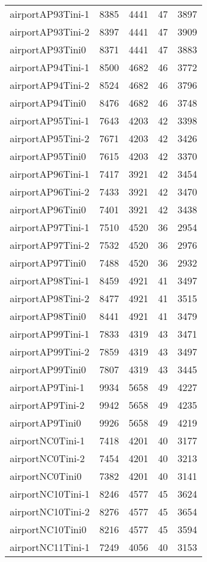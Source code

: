 \begin{longtable}{lrrrr}
airportAP93Tini-1 & 8385 & 4441 & 47 & 3897 \\
airportAP93Tini-2 & 8397 & 4441 & 47 & 3909 \\
airportAP93Tini0 & 8371 & 4441 & 47 & 3883 \\
airportAP94Tini-1 & 8500 & 4682 & 46 & 3772 \\
airportAP94Tini-2 & 8524 & 4682 & 46 & 3796 \\
airportAP94Tini0 & 8476 & 4682 & 46 & 3748 \\
airportAP95Tini-1 & 7643 & 4203 & 42 & 3398 \\
airportAP95Tini-2 & 7671 & 4203 & 42 & 3426 \\
airportAP95Tini0 & 7615 & 4203 & 42 & 3370 \\
airportAP96Tini-1 & 7417 & 3921 & 42 & 3454 \\
airportAP96Tini-2 & 7433 & 3921 & 42 & 3470 \\
airportAP96Tini0 & 7401 & 3921 & 42 & 3438 \\
airportAP97Tini-1 & 7510 & 4520 & 36 & 2954 \\
airportAP97Tini-2 & 7532 & 4520 & 36 & 2976 \\
airportAP97Tini0 & 7488 & 4520 & 36 & 2932 \\
airportAP98Tini-1 & 8459 & 4921 & 41 & 3497 \\
airportAP98Tini-2 & 8477 & 4921 & 41 & 3515 \\
airportAP98Tini0 & 8441 & 4921 & 41 & 3479 \\
airportAP99Tini-1 & 7833 & 4319 & 43 & 3471 \\
airportAP99Tini-2 & 7859 & 4319 & 43 & 3497 \\
airportAP99Tini0 & 7807 & 4319 & 43 & 3445 \\
airportAP9Tini-1 & 9934 & 5658 & 49 & 4227 \\
airportAP9Tini-2 & 9942 & 5658 & 49 & 4235 \\
airportAP9Tini0 & 9926 & 5658 & 49 & 4219 \\
airportNC0Tini-1 & 7418 & 4201 & 40 & 3177 \\
airportNC0Tini-2 & 7454 & 4201 & 40 & 3213 \\
airportNC0Tini0 & 7382 & 4201 & 40 & 3141 \\
airportNC10Tini-1 & 8246 & 4577 & 45 & 3624 \\
airportNC10Tini-2 & 8276 & 4577 & 45 & 3654 \\
airportNC10Tini0 & 8216 & 4577 & 45 & 3594 \\
airportNC11Tini-1 & 7249 & 4056 & 40 & 3153 \\

\end{longtable}
